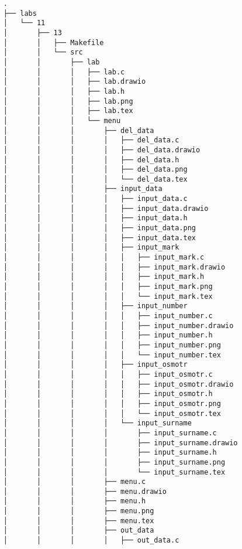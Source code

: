 \begin{verbatim}
    .
    ├── labs
    │   └── 11
    │       ├── 13
    │       │   ├── Makefile
    │       │   └── src
    │       │       ├── lab
    │       │       │   ├── lab.c
    │       │       │   ├── lab.drawio
    │       │       │   ├── lab.h
    │       │       │   ├── lab.png
    │       │       │   ├── lab.tex
    │       │       │   └── menu
    │       │       │       ├── del_data
    │       │       │       │   ├── del_data.c
    │       │       │       │   ├── del_data.drawio
    │       │       │       │   ├── del_data.h
    │       │       │       │   ├── del_data.png
    │       │       │       │   └── del_data.tex
    │       │       │       ├── input_data
    │       │       │       │   ├── input_data.c
    │       │       │       │   ├── input_data.drawio
    │       │       │       │   ├── input_data.h
    │       │       │       │   ├── input_data.png
    │       │       │       │   ├── input_data.tex
    │       │       │       │   ├── input_mark
    │       │       │       │   │   ├── input_mark.c
    │       │       │       │   │   ├── input_mark.drawio
    │       │       │       │   │   ├── input_mark.h
    │       │       │       │   │   ├── input_mark.png
    │       │       │       │   │   └── input_mark.tex
    │       │       │       │   ├── input_number
    │       │       │       │   │   ├── input_number.c
    │       │       │       │   │   ├── input_number.drawio
    │       │       │       │   │   ├── input_number.h
    │       │       │       │   │   ├── input_number.png
    │       │       │       │   │   └── input_number.tex
    │       │       │       │   ├── input_osmotr
    │       │       │       │   │   ├── input_osmotr.c
    │       │       │       │   │   ├── input_osmotr.drawio
    │       │       │       │   │   ├── input_osmotr.h
    │       │       │       │   │   ├── input_osmotr.png
    │       │       │       │   │   └── input_osmotr.tex
    │       │       │       │   └── input_surname
    │       │       │       │       ├── input_surname.c
    │       │       │       │       ├── input_surname.drawio
    │       │       │       │       ├── input_surname.h
    │       │       │       │       ├── input_surname.png
    │       │       │       │       └── input_surname.tex
    │       │       │       ├── menu.c
    │       │       │       ├── menu.drawio
    │       │       │       ├── menu.h
    │       │       │       ├── menu.png
    │       │       │       ├── menu.tex
    │       │       │       ├── out_data
    │       │       │       │   ├── out_data.c

\end{verbatim}

